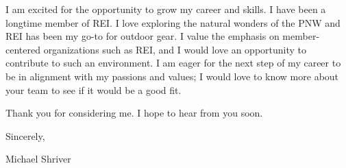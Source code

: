 \documentclass[10pt,oneside]{article}
\begin{document}
\vspace{\baselineskip}

I am excited for the opportunity to grow my career and skills. I have been a longtime member of REI. I love exploring the natural wonders of the PNW and REI has been my go-to for outdoor gear. I value the emphasis on member-centered organizations such as REI, and I would love an opportunity to contribute to such an environment. I am eager for the next step of my career to be in alignment with my passions and values; I would love to know more about your team to see if it would be a good fit.

\vspace{\baselineskip}

Thank you for considering me. I hope to hear from you soon.

\vspace{\baselineskip}

Sincerely,

\vspace{\baselineskip}

Michael Shriver
\end{document}
